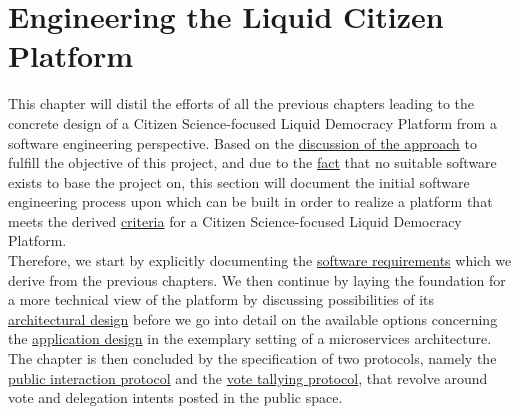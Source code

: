 \chapter{Engineering the Liquid Citizen Platform}
\label{ch:ProjectRequirements}
This chapter will distil the efforts of all the previous chapters leading to the concrete design of a  Citizen Science-focused Liquid Democracy Platform from a software engineering perspective.
Based on the \hyperref[ch:Approach]{discussion of the approach} to fulfill the objective of this project, and due to the \hyperref[sec:DiscussionRW]{fact} that no suitable software exists to base the project on, this section will document the initial software engineering process upon which can be built in order to realize a platform that meets the derived \hyperref[sec:Criteria]{criteria} for a Citizen Science-focused Liquid Democracy Platform.\\
Therefore, we start by explicitly documenting the \hyperref[sec:SoftwareRequirements]{software requirements} which we derive from the previous chapters.
We then continue by laying the foundation for a more technical view of the platform by discussing possibilities of its \hyperref[sec:ArchitecturalDesign]{architectural design} before we go into detail on the available options concerning the \hyperref[sec:ApplicationDesign]{application design} in the exemplary setting of a microservices architecture.
The chapter is then concluded by the specification of two protocols, namely the \hyperref[sec:PublicInteractionProtocoll]{public interaction protocol} and the \hyperref[sec:VoteTallyingProtocol]{vote tallying protocol}, that revolve around vote and delegation intents posted in the public space.





